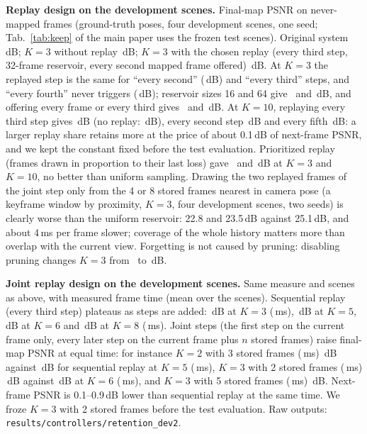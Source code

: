 \documentclass[10pt,twocolumn,letterpaper]{article}
\begin{document}
\textbf{Replay design on the development scenes.} Final-map PSNR on never-mapped frames (ground-truth poses, four development scenes, one seed; Tab.~\ref{tab:keep} of the main paper uses the frozen test scenes). Original system \engDevRetOrigFinal\,dB; $K{=}3$ without replay \engDevRetKThreeFinal\,dB; $K{=}3$ with the chosen replay (every third step, 32-frame reservoir, every second mapped frame offered) \engDevRetKThreeRpThreeFinal\,dB. At $K{=}3$ the replayed step is the same for ``every second'' (\engDevRetKThreeRTwoFinal\,dB) and ``every third'' steps, and ``every fourth'' never triggers (\engDevRetKThreeRFourFinal\,dB); reservoir sizes 16 and 64 give \engDevRetKThreeSOneSixFinal\ and \engDevRetKThreeSSixFourFinal\,dB, and offering every frame or every third gives \engDevRetKThreeTOneFinal\ and \engDevRetKThreeTThreeFinal\,dB. At $K{=}10$, replaying every third step gives \engDevRetKOneZeroRpThreeFinal\,dB (no replay: \engDevRetKOneZeroFinal\,dB), every second step \engDevRetKOneZeroETwoFinal\,dB and every fifth \engDevRetKOneZeroEFiveFinal\,dB: a larger replay share retains more at the price of about 0.1\,dB of next-frame PSNR, and we kept the constant fixed before the test evaluation. Prioritized replay (frames drawn in proportion to their last loss) gave \engDevRetKThreePeFinal\ and \engDevRetKOneZeroPeFinal\,dB at $K{=}3$ and $K{=}10$, no better than uniform sampling. Drawing the two replayed frames of the joint step only from the 4 or 8 stored frames nearest in camera pose (a keyframe window by proximity, $K{=}3$, four development scenes, two seeds) is clearly worse than the uniform reservoir: 22.8 and 23.5\,dB against 25.1\,dB, and about 4\,ms per frame slower; coverage of the whole history matters more than overlap with the current view. Forgetting is not caused by pruning: disabling pruning changes $K{=}3$ from \engDevRetKThreeFinal\ to \engDevRetKThreeNopruneFinal\,dB.

\textbf{Joint replay design on the development scenes.} Same measure and scenes as above, with measured frame time (mean over the scenes). Sequential replay (every third step) plateaus as steps are added: \engJrSeqThreeFinal\,dB at $K{=}3$ (\engJrSeqThreeMs\,ms), \engJrSeqFiveFinal\,dB at $K{=}5$, \engJrSeqSixFinal\,dB at $K{=}6$ and \engJrSeqEightFinal\,dB at $K{=}8$ (\engJrSeqEightMs\,ms). Joint steps (the first step on the current frame only, every later step on the current frame plus $n$ stored frames) raise final-map PSNR at equal time: for instance $K{=}2$ with 3 stored frames (\engJrJointTwoThreeMs\,ms) \engJrJointTwoThreeFinal\,dB against \engJrSeqFiveFinal\,dB for sequential replay at $K{=}5$ (\engJrSeqFiveMs\,ms), $K{=}3$ with 2 stored frames (\engJrJointThreeTwoMs\,ms) \engJrJointThreeTwoFinal\,dB against \engJrSeqSixFinal\,dB at $K{=}6$ (\engJrSeqSixMs\,ms), and $K{=}3$ with 5 stored frames (\engJrJointThreeFiveMs\,ms) \engJrJointThreeFiveFinal\,dB. Next-frame PSNR is 0.1--0.9\,dB lower than sequential replay at the same time. We froze $K{=}3$ with 2 stored frames before the test evaluation. Raw outputs: \texttt{results/controllers/retention\_dev2}.
\end{document}
